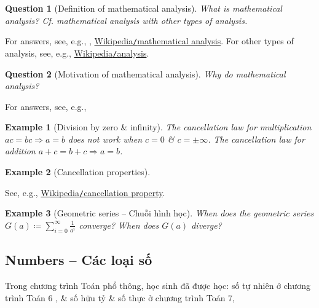 \documentclass{article}
\newtheorem{example}{Example}
\newtheorem{question}{Question}
\begin{document}
\begin{question}[Definition of mathematical analysis]
	What is mathematical analysis? Cf. mathematical analysis with other types of analysis.
\end{question}
For answers, see, e.g., \cite[Chap. 1, Sect. 1.1: {\it What Is Analysis?}, pp. 1--2]{Tao_analysis_1}, \href{https://en.wikipedia.org/wiki/Mathematical_analysis}{Wikipedia{\tt/}mathematical analysis}. For other types of analysis, see, e.g., \href{https://en.wikipedia.org/wiki/Analysis}{Wikipedia{\tt/}analysis}.

\begin{question}[Motivation of mathematical analysis]
	Why do mathematical analysis?
\end{question}
For answers, see, e.g., \cite[Chap. 1, Sect. 1.2: {\it Why Do Analysis?}, pp. 2--10]{Tao_analysis_1}

\begin{example}[Division by zero \& infinity]
	The cancellation law for multiplication $ac = bc\Rightarrow a = b$ does not work when $c = 0$ \& $c = \pm\infty$. The cancellation law for addition $a + c = b + c\Rightarrow a = b$.
\end{example}

\begin{example}[Cancellation properties]
	
\end{example}
See, e.g., \href{https://en.wikipedia.org/wiki/Cancellation_property}{Wikipedia{\tt/}cancellation property}.

\begin{example}[Geometric series -- Chuỗi hình học]
	When does the geometric series $G(a)\coloneqq\sum_{i=0}^\infty \frac{1}{a^i}$ converge? When does $G(a)$ diverge? 
\end{example}


\subsection{Numbers -- Các loại số}
Trong chương trình Toán phổ thông, học sinh đã được học: số tự nhiên ở chương trình Toán 6 \cite{SGK_Toan_6_CD_tap_1, SGK_Toan_6_CD_tap_2}, \& số hữu tỷ \& số thực ở chương trình Toán 7,

\end{document}
